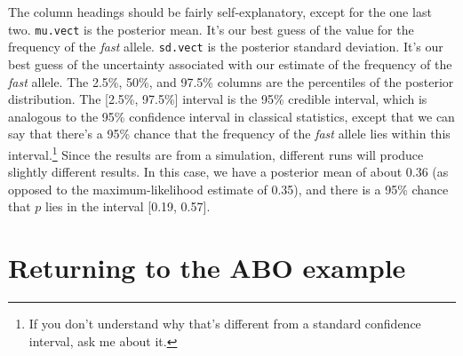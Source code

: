\documentclass[12pt]{article}
\begin{document}
The column headings should be fairly self-explanatory, except for the
one last two. {\tt mu.vect} is the posterior mean. It's our best guess of
the value for the frequency of the {\it fast\/} allele. {\tt sd.vect} is
the posterior standard deviation. It's our best guess of the
uncertainty associated with our estimate of the frequency of the {\it
  fast\/} allele. The 2.5\%, 50\%, and 97.5\% columns are the
percentiles of the posterior distribution. The [2.5\%, 97.5\%]
interval is the 95\% credible interval, which is analogous to the 95\%
confidence interval in classical statistics, except that we can say
that there's a 95\% chance that the frequency of the {\it fast\/}
allele lies within this interval.\footnote{If you don't understand why
  that's different from a standard confidence interval, ask me about
  it.} Since the results are from a simulation, different runs will
produce slightly different results. In this case, we have a posterior
mean of about 0.36 (as opposed to the maximum-likelihood estimate of
0.35), and there is a 95\% chance that $p$ lies in the interval [0.19,
0.57].

\section*{Returning to the ABO example}
\end{document}

